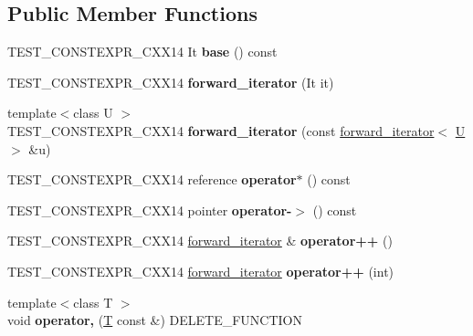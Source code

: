 \subsection*{Public Member Functions}
\begin{DoxyCompactItemize}
\item 
\mbox{\label{classforward__iterator_af1bd4cde98790c17c18e9c06167bfbeb}} 
T\+E\+S\+T\+\_\+\+C\+O\+N\+S\+T\+E\+X\+P\+R\+\_\+\+C\+X\+X14 It {\bfseries base} () const
\item 
\mbox{\label{classforward__iterator_aaafa251889c5e1ff9c8cc056ad130c9f}} 
T\+E\+S\+T\+\_\+\+C\+O\+N\+S\+T\+E\+X\+P\+R\+\_\+\+C\+X\+X14 {\bfseries forward\+\_\+iterator} (It it)
\item 
\mbox{\label{classforward__iterator_a8d24b59548ed9d510a7480b472814586}} 
{\footnotesize template$<$class U $>$ }\\T\+E\+S\+T\+\_\+\+C\+O\+N\+S\+T\+E\+X\+P\+R\+\_\+\+C\+X\+X14 {\bfseries forward\+\_\+iterator} (const \mbox{\hyperlink{classforward__iterator}{forward\+\_\+iterator}}$<$ \mbox{\hyperlink{union_u}{U}} $>$ \&u)
\item 
\mbox{\label{classforward__iterator_a7ef35cae8bc4b2aa605d80659358dfe0}} 
T\+E\+S\+T\+\_\+\+C\+O\+N\+S\+T\+E\+X\+P\+R\+\_\+\+C\+X\+X14 reference {\bfseries operator$\ast$} () const
\item 
\mbox{\label{classforward__iterator_a461c94571e1add6d5cbf52b1f297bcbc}} 
T\+E\+S\+T\+\_\+\+C\+O\+N\+S\+T\+E\+X\+P\+R\+\_\+\+C\+X\+X14 pointer {\bfseries operator-\/$>$} () const
\item 
\mbox{\label{classforward__iterator_ae56b4230e3682716c071fe19e1ee7e2f}} 
T\+E\+S\+T\+\_\+\+C\+O\+N\+S\+T\+E\+X\+P\+R\+\_\+\+C\+X\+X14 \mbox{\hyperlink{classforward__iterator}{forward\+\_\+iterator}} \& {\bfseries operator++} ()
\item 
\mbox{\label{classforward__iterator_a18d1a4757e33d1b52130b63e8c1d1a4d}} 
T\+E\+S\+T\+\_\+\+C\+O\+N\+S\+T\+E\+X\+P\+R\+\_\+\+C\+X\+X14 \mbox{\hyperlink{classforward__iterator}{forward\+\_\+iterator}} {\bfseries operator++} (int)
\item 
\mbox{\label{classforward__iterator_a8253cc2b74384c65aa29bbc2ef3b1f5a}} 
{\footnotesize template$<$class T $>$ }\\void {\bfseries operator,} (\mbox{\hyperlink{struct_t}{T}} const \&) D\+E\+L\+E\+T\+E\+\_\+\+F\+U\+N\+C\+T\+I\+ON
\end{DoxyCompactItemize}
